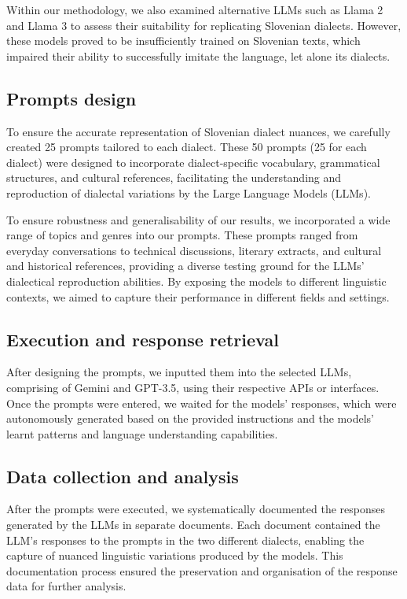 \documentclass[fleqn,moreauthors,10pt]{ds_report}
\begin{document}
    Within our methodology, we also examined alternative LLMs such as Llama 2 and Llama 3 to assess their suitability for replicating Slovenian dialects. However, these models proved to be insufficiently trained on Slovenian texts, which impaired their ability to successfully imitate the language, let alone its dialects.
    
\subsection{Prompts design}

    To ensure the accurate representation of Slovenian dialect nuances, we carefully created 25 prompts tailored to each dialect. These 50 prompts (25 for each dialect) were designed to incorporate dialect-specific vocabulary, grammatical structures, and cultural references, facilitating the understanding and reproduction of dialectal variations by the Large Language Models (LLMs). 
    
    To ensure robustness and generalisability of our results, we incorporated a wide range of topics and genres into our prompts. These prompts ranged from everyday conversations to technical discussions, literary extracts, and cultural and historical references, providing a diverse testing ground for the LLMs' dialectical reproduction abilities. By exposing the models to different linguistic contexts, we aimed to capture their performance in different fields and settings.
    
\subsection{Execution and response retrieval}

    After designing the prompts, we inputted them into the selected LLMs, comprising of Gemini and GPT-3.5, using their respective APIs or interfaces. Once the prompts were entered, we waited for the models' responses, which were autonomously generated  based on the provided instructions and the models' learnt patterns and language understanding capabilities.
    
\subsection{Data collection and analysis}

    After the prompts were executed, we systematically documented the responses generated by the LLMs in separate documents. Each document contained the LLM's responses to the prompts in the two different dialects, enabling the capture of nuanced linguistic variations produced by the models. This documentation process ensured the preservation and organisation of the response data for further analysis.
\end{document}
